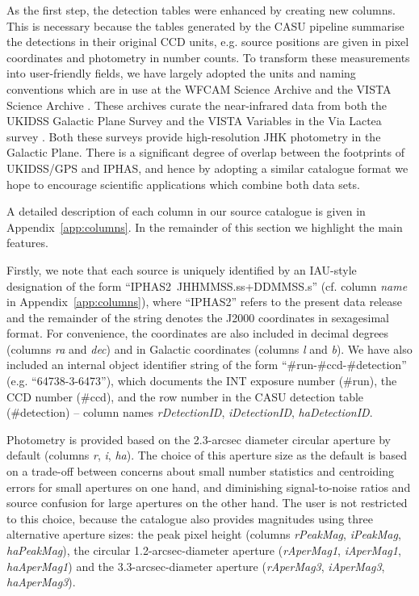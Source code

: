 \documentclass[useAMS,usenatbib]{mn2e}
\begin{document}
As the first step, the detection tables 
were enhanced by creating new columns.
This is necessary because the tables 
generated by the CASU pipeline 
summarise the detections 
in their original CCD units,
e.g. source positions are given in pixel coordinates 
and photometry in number counts.
To transform these measurements into
user-friendly fields,
we have largely adopted the units and naming conventions
which are in use at the 
WFCAM Science Archive \citep[WSA;][]{Hambly2008}
and the VISTA Science Archive \citep[VSA;][]{Cross2012}.
These archives curate the near-infrared data from both
the UKIDSS Galactic Plane Survey \citep[GPS;][]{Lucas2008}
and the 
VISTA Variables in the Via Lactea survey \cite[VVV;][]{Minniti2010}.
Both these surveys provide high-resolution JHK photometry
in the Galactic Plane.
There is a significant degree of overlap
between the footprints of UKIDSS/GPS and IPHAS,
and hence by adopting a similar catalogue format
we hope to encourage scientific applications
which combine both data sets.

A detailed description of each column in our source catalogue
is given in Appendix~\ref{app:columns}.
In the remainder of this section we highlight the main features.

Firstly, we note that each source is uniquely identified by an
IAU-style designation of the form ``IPHAS2\ JHHMMSS.ss+DDMMSS.s''
(cf. column \emph{name} in Appendix~\ref{app:columns}),
where ``IPHAS2'' refers to the present
data release and the remainder of the string
denotes the J2000 coordinates in sexagesimal format.
For convenience, the coordinates
are also included in decimal degrees
(columns \emph{ra} and \emph{dec})
and in Galactic coordinates
(columns \emph{l} and \emph{b}).
We have also included an internal object identifier string 
of the form ``\#run-\#ccd-\#detection''
(e.g. ``64738-3-6473''),
which documents the INT exposure number (\#run),
the CCD number (\#ccd),
and the row number in the CASU detection table (\#detection)
-- column names \emph{rDetectionID},
\emph{iDetectionID}, \emph{haDetectionID}.

Photometry is provided based on the 2.3-arcsec diameter circular aperture
by default (columns \emph{r}, \emph{i}, \emph{ha}).
The choice of this aperture size as the default 
is based on a trade-off between concerns 
about small number statistics and centroiding errors
for small apertures on one hand,
and diminishing signal-to-noise ratios and source confusion
for large apertures on the other hand.
The user is not restricted to this choice, because
the catalogue also provides magnitudes
using three alternative aperture sizes:
the peak pixel height 
(columns \emph{rPeakMag}, \emph{iPeakMag}, \emph{haPeakMag}),
the circular 1.2-arcsec-diameter aperture 
(\emph{rAperMag1}, \emph{iAperMag1},
 \emph{haAperMag1}) and
the 3.3-arcsec-diameter aperture 
(\emph{rAperMag3}, \emph{iAperMag3},
 \emph{haAperMag3}).
\end{document}
